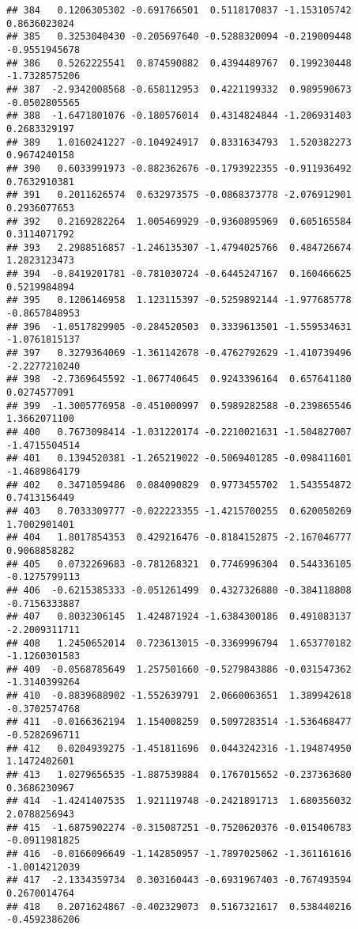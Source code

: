 \documentclass[
]{article}
\begin{document}
\begin{verbatim}
## 384   0.1206305302 -0.691766501  0.5118170837 -1.153105742  0.8636023024
## 385   0.3253040430 -0.205697640 -0.5288320094 -0.219009448 -0.9551945678
## 386   0.5262225541  0.874590882  0.4394489767  0.199230448 -1.7328575206
## 387  -2.9342008568 -0.658112953  0.4221199332  0.989590673 -0.0502805565
## 388  -1.6471801076 -0.180576014  0.4314824844 -1.206931403  0.2683329197
## 389   1.0160241227 -0.104924917  0.8331634793  1.520382273  0.9674240158
## 390   0.6033991973 -0.882362676 -0.1793922355 -0.911936492  0.7632910381
## 391   0.2011626574  0.632973575 -0.0868373778 -2.076912901  0.2936077653
## 392   0.2169282264  1.005469929 -0.9360895969  0.605165584  0.3114071792
## 393   2.2988516857 -1.246135307 -1.4794025766  0.484726674  1.2823123473
## 394  -0.8419201781 -0.781030724 -0.6445247167  0.160466625  0.5219984894
## 395   0.1206146958  1.123115397 -0.5259892144 -1.977685778 -0.8657848953
## 396  -1.0517829905 -0.284520503  0.3339613501 -1.559534631 -1.0761815137
## 397   0.3279364069 -1.361142678 -0.4762792629 -1.410739496 -2.2277210240
## 398  -2.7369645592 -1.067740645  0.9243396164  0.657641180  0.0274577091
## 399  -1.3005776958 -0.451000997  0.5989282588 -0.239865546  1.3662071100
## 400   0.7673098414 -1.031220174 -0.2210021631 -1.504827007 -1.4715504514
## 401   0.1394520381 -1.265219022 -0.5069401285 -0.098411601 -1.4689864179
## 402   0.3471059486  0.084090829  0.9773455702  1.543554872  0.7413156449
## 403   0.7033309777 -0.022223355 -1.4215700255  0.620050269  1.7002901401
## 404   1.8017854353  0.429216476 -0.8184152875 -2.167046777  0.9068858282
## 405   0.0732269683 -0.781268321  0.7746996304  0.544336105 -0.1275799113
## 406  -0.6215385333 -0.051261499  0.4327326880 -0.384118808 -0.7156333887
## 407   0.8032306145  1.424871924 -1.6384300186  0.491083137 -2.2009311711
## 408   1.2450652014  0.723613015 -0.3369996794  1.653770182 -1.1260301583
## 409  -0.0568785649  1.257501660 -0.5279843886 -0.031547362 -1.3140399264
## 410  -0.8839688902 -1.552639791  2.0660063651  1.389942618 -0.3702574768
## 411  -0.0166362194  1.154008259  0.5097283514 -1.536468477 -0.5282696711
## 412   0.0204939275 -1.451811696  0.0443242316 -1.194874950  1.1472402601
## 413   1.0279656535 -1.887539884  0.1767015652 -0.237363680  0.3686230967
## 414  -1.4241407535  1.921119748 -0.2421891713  1.680356032  2.0788256943
## 415  -1.6875902274 -0.315087251 -0.7520620376 -0.015406783 -0.0911981825
## 416  -0.0166096649 -1.142850957 -1.7897025062 -1.361161616 -1.0014212039
## 417  -2.1334359734  0.303160443 -0.6931967403 -0.767493594  0.2670014764
## 418   0.2071624867 -0.402329073  0.5167321617  0.538440216 -0.4592386206

\end{verbatim}
\end{document}
